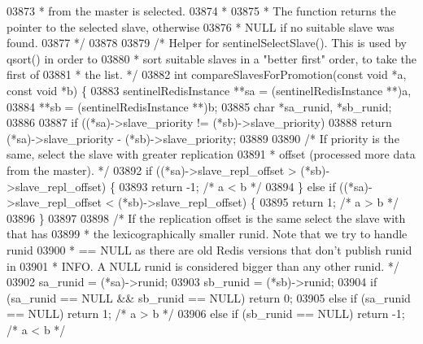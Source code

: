 \begin{DoxyCode}
{{{{{{{{{{{{{{{{{{{{{{{{{{{{{{{{{{{{{{{{{{{{{{{{{{{{{{{{{{{{{{{{{{{{{{{{{{{{{{{{{{{{{{{03873 \textcolor{comment}{ * from the master is selected.}
03874 \textcolor{comment}{ *}
03875 \textcolor{comment}{ * The function returns the pointer to the selected slave, otherwise}
03876 \textcolor{comment}{ * NULL if no suitable slave was found.}
03877 \textcolor{comment}{ */}
03878 
03879 \textcolor{comment}{/* Helper for sentinelSelectSlave(). This is used by qsort() in order to}
03880 \textcolor{comment}{ * sort suitable slaves in a "better first" order, to take the first of}
03881 \textcolor{comment}{ * the list. */}
03882 \textcolor{keywordtype}{int} compareSlavesForPromotion(\textcolor{keyword}{const} \textcolor{keywordtype}{void} *a, \textcolor{keyword}{const} \textcolor{keywordtype}{void} *b) \{
03883     sentinelRedisInstance **sa = (sentinelRedisInstance **)a,
03884                           **sb = (sentinelRedisInstance **)b;
03885     \textcolor{keywordtype}{char} *sa\_runid, *sb\_runid;
03886 
03887     \textcolor{keywordflow}{if} ((*sa)->slave\_priority != (*sb)->slave\_priority)
03888         \textcolor{keywordflow}{return} (*sa)->slave\_priority - (*sb)->slave\_priority;
03889 
03890     \textcolor{comment}{/* If priority is the same, select the slave with greater replication}
03891 \textcolor{comment}{     * offset (processed more data from the master). */}
03892     \textcolor{keywordflow}{if} ((*sa)->slave\_repl\_offset > (*sb)->slave\_repl\_offset) \{
03893         \textcolor{keywordflow}{return} -1; \textcolor{comment}{/* a < b */}
03894     \} \textcolor{keywordflow}{else} \textcolor{keywordflow}{if} ((*sa)->slave\_repl\_offset < (*sb)->slave\_repl\_offset) \{
03895         \textcolor{keywordflow}{return} 1; \textcolor{comment}{/* a > b */}
03896     \}
03897 
03898     \textcolor{comment}{/* If the replication offset is the same select the slave with that has}
03899 \textcolor{comment}{     * the lexicographically smaller runid. Note that we try to handle runid}
03900 \textcolor{comment}{     * == NULL as there are old Redis versions that don't publish runid in}
03901 \textcolor{comment}{     * INFO. A NULL runid is considered bigger than any other runid. */}
03902     sa\_runid = (*sa)->runid;
03903     sb\_runid = (*sb)->runid;
03904     \textcolor{keywordflow}{if} (sa\_runid == NULL && sb\_runid == NULL) \textcolor{keywordflow}{return} 0;
03905     \textcolor{keywordflow}{else} \textcolor{keywordflow}{if} (sa\_runid == NULL) \textcolor{keywordflow}{return} 1;  \textcolor{comment}{/* a > b */}
03906     \textcolor{keywordflow}{else} \textcolor{keywordflow}{if} (sb\_runid == NULL) \textcolor{keywordflow}{return} -1; \textcolor{comment}{/* a < b */}
}}}}}}}}}}}}}}}}}}}}}}}}}}}}}}}}}}}}}}}}}}}}}}}}}}}}}}}}}}}}}}}}}}}}}}}}}}}}}}}}}}}}}}}
\end{DoxyCode}
